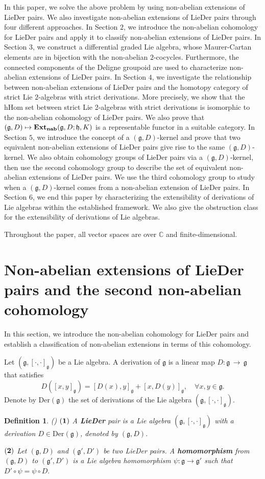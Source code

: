 \documentclass[12pt]{amsart}
\newtheorem{defi}[thm]{Definition}
\newcommand{\lon }{\,\rightarrow\,}
\newcommand{\g}{\mathfrak g}
\newcommand{\h}{\mathfrak h}
\newcommand{\LD}{{\rm LieDer }}
\begin{document}
In this paper, we solve the above problem by using non-abelian extensions of \LD pairs. We also investigate non-abelian extensions of \LD pairs through four different approaches. In Section $2$, we introduce the non-abelian cohomology for \LD pairs and apply it to classify non-abelian extensions of \LD pairs. In Section $3$, we construct a differential graded Lie algebra, whose Maurer-Cartan elements are in bijection with the non-abelian $2$-cocycles. Furthermore, the connected components of the Deligne groupoid are used to characterize non-abelian extensions of \LD pairs. In Section $4$, we investigate the relationship between non-abelian extensions of \LD pairs and the homotopy category of strict Lie $2$-algebras with strict derivations. More precisely, we show that the hHom set between strict Lie 2-algebras with strict derivations is isomorphic to the non-abelian cohomology of \LD pairs. We also prove that $(\g,D)\mapsto{\rm{\bf Ext_{nab}}}(\g,D;\h,K)$ is a representable functor in a suitable category. In Section $5$, we introduce the concept of a $(\g, D)$-kernel and prove that two equivalent non-abelian extensions of \LD pairs give rise to the same $(\g, D)$-kernel. We also obtain cohomology groups of \LD pairs via a $(\g, D)$-kernel, then use the second cohomology group to describe the set of equivalent non-abelian extensions of \LD pairs. We use the third cohomology group to study when a $(\g, D)$-kernel comes from a non-abelian extension of \LD pairs. In Section $6$, we end this paper by characterizing the extensibility of derivations of Lie algebras within the established framework. We also give the obstruction class for the extensibility of derivations of Lie algebras. 

Throughout the paper, all vector spaces are over $\mathbb{C}$ and finite-dimensional.


\section{Non-abelian extensions of {\rm LieDer} pairs and the second non-abelian cohomology}
 In this section, we introduce the non-abelian cohomology for {\rm LieDer} pairs and establish a classification of non-abelian extensions in terms of this cohomology.

Let $(\g, [\cdot, \cdot]_\g)$ be a Lie algebra. A derivation of $\g$ is a linear map $D:\g\lon\g$ that satisfies 
$$
D([x, y]_\g)=[D(x), y]_\g+[x, D(y)]_\g, \quad \forall x, y\in\g.
$$
Denote by $\mathrm{Der}(\g)$ the set of derivations of the Lie algebra $(\g, [\cdot, \cdot]_\g)$.
\begin{defi}{\rm(\cite{TFS})}
${\bf (1)}$ A {\bf LieDer} pair is a Lie algebra $(\g, [\cdot, \cdot]_\g)$ with a derivation $D\in\mathrm{Der}(\g)$, 
denoted by $(\g, D)$.

${\bf (2)}$ Let $(\g, D)$ and $(\g',D')$ be two {\rm LieDer} pairs. A {\bf homomorphism} from $(\g,D)$ to $(\g',D')$ is a Lie algebra homomorphism $\psi:\g\rightarrow\g'$ such that
$
D'\circ\psi=\psi\circ D.
$
\end{defi}
\end{document}
